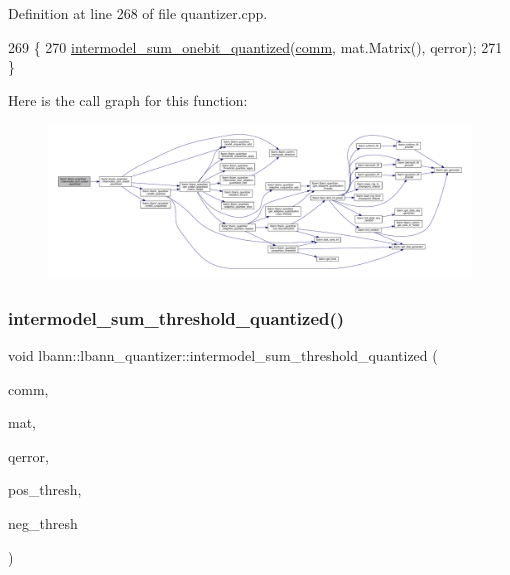 Definition at line 268 of file quantizer.\+cpp.


\begin{DoxyCode}
269                                                \{
270   \hyperlink{classlbann_1_1lbann__quantizer_a4b326de1ca5b7eba6415b6f42f83335b}{intermodel\_sum\_onebit\_quantized}(\hyperlink{file__io_8cpp_ab048c6f9fcbcfaa57ce68b00263dbebe}{comm}, mat.Matrix(), qerror);
271 \}
\end{DoxyCode}
Here is the call graph for this function\+:\nopagebreak
\begin{figure}[H]
\begin{center}
\leavevmode
\includegraphics[width=350pt]{classlbann_1_1lbann__quantizer_af24e00e26e157f102f3cef547de40ae1_cgraph}
\end{center}
\end{figure}
\mbox{\label{classlbann_1_1lbann__quantizer_a0bd572557675705c5e080b92d74b02ae}} 
\subsubsection{\texorpdfstring{intermodel\+\_\+sum\+\_\+threshold\+\_\+quantized()}{intermodel\_sum\_threshold\_quantized()}\hspace{0.1cm}{\footnotesize\ttfamily [1/2]}}
{\footnotesize\ttfamily void lbann\+::lbann\+\_\+quantizer\+::intermodel\+\_\+sum\+\_\+threshold\+\_\+quantized (\begin{DoxyParamCaption}\item[{\hyperlink{classlbann_1_1lbann__comm}{lbann\+\_\+comm} $\ast$}]{comm,  }\item[{\hyperlink{base_8hpp_a68f11fdc31b62516cb310831bbe54d73}{Mat} \&}]{mat,  }\item[{\hyperlink{base_8hpp_a68f11fdc31b62516cb310831bbe54d73}{Mat} \&}]{qerror,  }\item[{Data\+Type}]{pos\+\_\+thresh,  }\item[{Data\+Type}]{neg\+\_\+thresh }\end{DoxyParamCaption})}

